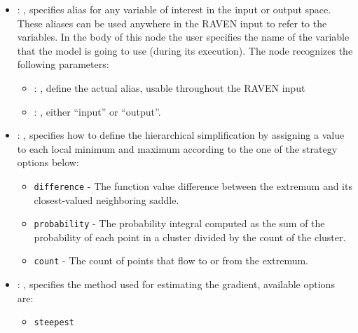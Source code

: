 \begin{itemize}
    \item {}: , 
      specifies alias for         any variable of interest in the input or output space. These
      aliases can be used anywhere in the RAVEN input to         refer to the variables. In the body
      of this node the user specifies the name of the variable that the model is going to use
      (during its execution).
      The  node recognizes the following parameters:
        \begin{itemize}
          \item {}: , 
            define the actual alias, usable throughout the RAVEN input
          \item {}: , 
            either ``input'' or ``output''.
      \end{itemize}

    \item {}: , 
      specifies how                                                  to define the hierarchical
      simplification by assigning a value to each local
      minimum and maximum according to the one of the strategy options below:
      \begin{itemize}                                                    \item \texttt{difference} -
      The function value difference between the
      extremum and its closest-valued neighboring saddle.
      \item \texttt{probability} - The probability integral computed as the
      sum of the probability of each point in a cluster divided by the count of
      the cluster.                                                    \item \texttt{count} - The
      count of points that flow to or from the
      extremum.                                                  \end{itemize}

    \item {}: , 
      specifies the                                                  method used for estimating the
      gradient, available options are:
      \begin{itemize}                                                    \item \texttt{steepest}
      \end{itemize}


\end{itemize}
